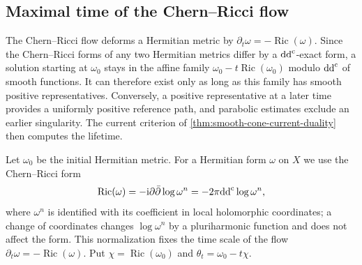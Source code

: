 \subsection{Maximal time of the Chern--Ricci flow}
\label{subsec:chern-ricci-maximal-time}

The Chern--Ricci flow deforms a Hermitian metric by $\partial_t\omega=-\operatorname{Ric}(\omega)$. Since the Chern--Ricci forms of any two Hermitian metrics differ by a $\mathrm{dd}^{\mathrm{c}}$-exact form, a solution starting at $\omega_0$ stays in the affine family $\omega_0-t\operatorname{Ric}(\omega_0)$ modulo $\mathrm{dd}^{\mathrm{c}}$ of smooth functions. It can therefore exist only as long as this family has smooth positive representatives. Conversely, a positive representative at a later time provides a uniformly positive reference path, and parabolic estimates exclude an earlier singularity. The current criterion of \cref{thm:smooth-cone-current-duality} then computes the lifetime.

Let $\omega_0$ be the initial Hermitian metric. For a Hermitian form $\omega$ on $X$ we use the Chern--Ricci form
\[
 \operatorname{Ric}(\omega)=-\mathrm{i}\partial\bar\partial\log\omega^n
                          =-2\pi\mathrm{dd}^{\mathrm{c}}\log\omega^n,
\]
where $\omega^n$ is identified with its coefficient in local holomorphic coordinates; a change of coordinates changes $\log\omega^n$ by a pluriharmonic function and does not affect the form. This normalization fixes the time scale of the flow $\partial_t\omega=-\operatorname{Ric}(\omega)$. Put $\chi=\operatorname{Ric}(\omega_0)$ and $\theta_t=\omega_0-t\chi$.

